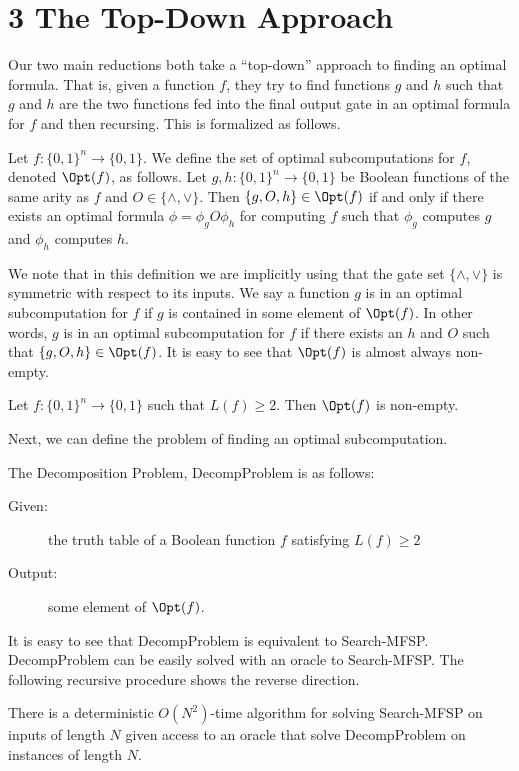 \section*{3 The Top-Down Approach}
Our two main reductions both take a ``top-down'' approach to finding an optimal formula. That is, given a function $f$, they try to find functions $g$ and $h$ such that $g$ and $h$ are the two functions fed into the final output gate in an optimal formula for $f$ and then recursing.
This is formalized as follows.
\setcounter{nttheorem}{16}
\begin{ntdefinition}
Let $f:\{0,1\}^n\to\{0,1\}$. We define the set of optimal subcomputations for $f$, denoted $\Opt(f)$, as follows.
Let $g,h:\{0,1\}^n\to\{0,1\}$ be Boolean functions of the same arity as $f$ and $O\in\{\land,\lor\}$. Then $\{g,O,h\}\in\Opt(f)$ if and only if there exists an optimal formula $\phi=\phi_gO\phi_h$ for computing $f$ such that $\phi_g$ computes $g$ and $\phi_h$ computes $h$.
\end{ntdefinition}
We note that in this definition we are implicitly using that the gate set $\{\land,\lor\}$ is symmetric with respect to its inputs.
We say a function $g$ is in an optimal subcomputation for $f$ if $g$ is contained in some element of $\Opt(f)$. In other words, $g$ is in an optimal subcomputation for $f$ if there exists an $h$ and $O$ such that $\{g,O,h\}\in\Opt(f)$.
It is easy to see that $\Opt(f)$ is almost always non-empty.
\begin{ntproposition}
Let $f:\{0,1\}^n\to\{0,1\}$ such that $L(f)\geq 2$. Then $\Opt(f)$ is non-empty.
\end{ntproposition}
Next, we can define the problem of finding an optimal subcomputation.
\begin{ntdefinition}
The Decomposition Problem, DecompProblem is as follows:
\begin{description}\item[Given:] the truth table of a Boolean function $f$ satisfying $L(f)\geq 2$\item[Output:] some element of $\Opt(f)$.\end{description}
\end{ntdefinition}
It is easy to see that DecompProblem is equivalent to Search-MFSP. DecompProblem can be easily solved with an oracle to Search-MFSP. The following recursive procedure shows the reverse direction.
\begin{nttheorem}
There is a deterministic $O(N^2)$-time algorithm for solving Search-MFSP on inputs of length $N$ given access to an oracle that solve DecompProblem on instances of length $N$.
\end{nttheorem}
